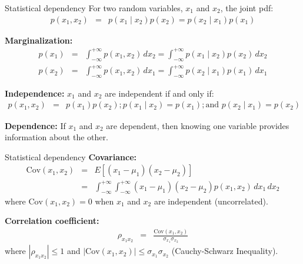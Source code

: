 \documentclass{beamer}
\begin{document}
\begin{frame}{Statistical dependency}
For two random variables, $x_1$ and $x_2$, the joint pdf:
\begin{eqnarray*}
p(x_1,x_2) &=& p(x_1\mid x_2)p(x_2) = p(x_2\mid x_1)p(x_1)
\end{eqnarray*}

\textbf{Marginalization:}
\begin{eqnarray*}
p(x_1) &=& \int_{-\infty}^{+\infty} p(x_1,x_2) \, dx_2 = \int_{-\infty}^{+\infty} p(x_1\mid x_2)p(x_2) \, dx_2 \\
p(x_2) &=& \int_{-\infty}^{+\infty} p(x_1,x_2) \, dx_1 = \int_{-\infty}^{+\infty} p(x_2\mid x_1)p(x_1) \, dx_1
\end{eqnarray*}

\textbf{Independence:} $x_1$ and $x_2$ are independent if and only if:
\begin{eqnarray*}
p(x_1,x_2) &=& p(x_1)p(x_2); p(x_1\mid x_2) = p(x_1); \mbox{and }p(x_2\mid x_1) = p(x_2)
\end{eqnarray*}

\textbf{Dependence:} If $x_1$ and $x_2$ are dependent, then knowing one variable provides information about the other.
\end{frame}


\begin{frame}{Statistical dependency}
\textbf{Covariance:}
\begin{eqnarray*}
\text{Cov}(x_1,x_2) &=& E[(x_1-\mu_1)(x_2-\mu_2)] \\
&=& \int_{-\infty}^{+\infty}\int_{-\infty}^{+\infty}(x_1-\mu_1)(x_2-\mu_2)p(x_1,x_2) \, dx_1 \, dx_2
\end{eqnarray*}
where $\text{Cov}(x_1,x_2) = 0$ when $x_1$ and $x_2$ are independent (\alert{uncorrelated}).

\vspace{0.5cm}
\textbf{Correlation coefficient:} 
\begin{eqnarray*}
\rho_{x_1x_2} &=& \frac{\text{Cov}(x_1,x_2)}{\sigma_{x_1}\sigma_{x_2}}
\end{eqnarray*}
where $|\rho_{x_1x_2}| \leq 1$ and $|\text{Cov}(x_1,x_2)| \leq \sigma_{x_1}\sigma_{x_2}$ (\alert{Cauchy-Schwarz Inequality}).
\end{frame}
\end{document}
